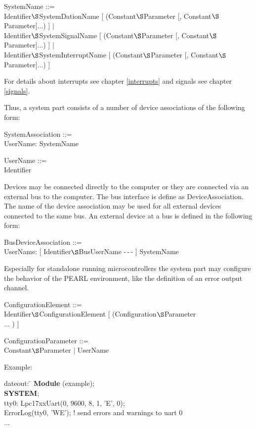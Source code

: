 \begin{added}
SystemName ::=\\
\x Identifier$\S $SystemDationName [ (Constant$\S $Parameter [, Constant$\S $Parameter]...) ] $\mid$ \\
\x Identifier$\S $SystemSignalName [ (Constant$\S $Parameter [, Constant$\S $Parameter]...) ] $\mid$ \\
\x Identifier$\S $SystemInterruptName [ (Constant$\S $Parameter [, Constant$\S $Parameter]...) ] 

For details about interrupts see chapter \ref{interrupts} and 
signals see chapter \ref{signals}.

Thus, a system part consists of a number of device associations of the
following form:

SystemAssociation ::=\\
\x UserName: SystemName 

UserName ::=\\
\x Identifier

Devices may be connected directly to the computer or they are connected 
via an external bus to the computer. The bus interface is define
as DeviceAssociation. The name of the device association may be 
used for all external devices connected to the same bus.
An external device at a bus is defined in the following form:

BusDeviceAssociation ::=\\
\x UserName: [ Identifier$\S $BusUserName -\,-\,-  ] SystemName 

Especially for standalone running microcontrollers the system part
may configure the behavior of the PEARL environment, like the
definition of an error output channel. 

ConfigurationElement ::=\\
\x Identifier$\S $ConfigurationElement [ (Configuration$\S $Parameter\\
\x \x \x \x \x {}... ) ]

ConfigurationParameter ::=\\
\x  Constant$\S $Parameter $\mid$  UserName 

Example:
\begin{tabbing}
\x dateout: \= \kill
{\bf Module} (example); \> \\
{\bf SYSTEM}; \> \\
\x tty0:    \> Lpc17xxUart(0, 9600, 8, 1, 'E', 0);\\
\x  \> ErrorLog(tty0, 'WE'); ! send errors and warnings to uart 0\\
\x ...
\end{tabbing}

\end{added}

